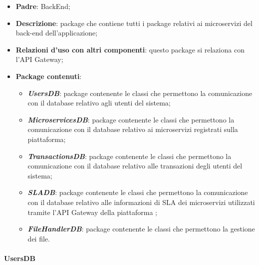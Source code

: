 \begin{itemize}
	\item \textbf{Padre}: BackEnd;
	
	\item \textbf{Descrizione}: package che contiene tutti i package relativi ai microservizi del back-end dell'applicazione;
	
	\item \textbf{Relazioni d'uso con altri componenti}: questo package si relaziona con l'API Gateway;
	
	\item \textbf{Package contenuti}:
	\begin{itemize}
		\item \textbf{\textit{UsersDB}}: package contenente le classi che permettono la comunicazione con il database relativo agli utenti del sistema;
		
		\item \textbf{\textit{MicroservicesDB}}: package contenente le classi che permettono la comunicazione con il database relativo ai microservizi registrati sulla piattaforma;
		
		\item \textbf{\textit{TransactionsDB}}: package contenente le classi che permettono la comunicazione con il database relativo alle transazioni degli utenti del sistema;
		
		\item \textbf{\textit{SLADB}}: package contenente le classi che permettono la comunicazione con il database relativo alle informazioni di SLA dei microservizi utilizzati tramite l'API Gateway della piattaforma \progetto;
		
		\item \textbf{\textit{FileHandlerDB}}: package contenente le classi che permettono la gestione dei file.
	\end{itemize}
\end{itemize}

\paragraph{UsersDB}

